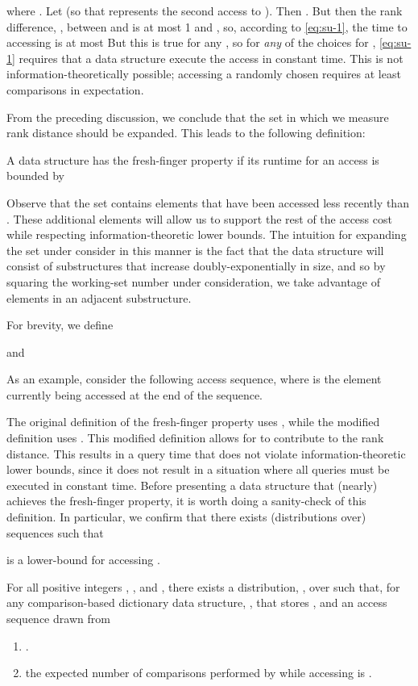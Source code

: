 \documentclass{llncs}
\begin{document}
where .  Let  (so that  represents the second access to ).  Then .  But then the rank difference, , between  and  is at most 1 and , so, according to \eqref{eq:su-1}, the time to accessing  is at most
But this is true for any , so for \emph{any} of the  choices for , \eqref{eq:su-1} requires that a data structure execute the access in constant time. This is not information-theoretically possible; accessing a randomly chosen  requires at least  comparisons in expectation.  

From the preceding discussion, we conclude that the set in which we measure rank distance should be expanded.  This leads to the following definition:

\begin{definition} A data structure has the fresh-finger property if its runtime for an access is bounded by

\end{definition}

Observe that the set  contains elements that have been accessed less recently than . These additional elements will allow us to support the rest of the access cost while respecting information-theoretic lower bounds. The intuition for expanding the set under consider in this manner is the fact that the data structure will consist of substructures that increase doubly-exponentially in size, and so by squaring the working-set number under consideration, we take advantage of elements in an adjacent substructure.

For brevity, we define

and


As an example, consider the following access sequence, where  is the element currently being accessed at the end of the sequence.


The original definition of the fresh-finger property uses , while the modified definition uses . This modified definition allows for  to contribute to the rank distance. This results in a query time that does not violate information-theoretic lower bounds, since it does not result in a situation where all  queries must be executed in constant time. 
Before presenting a data structure that (nearly) achieves the fresh-finger property, it is worth doing a sanity-check of this definition.  In particular, we confirm that there exists (distributions over) sequences  such that

is a lower-bound for accessing .

\begin{theorem}
  For all positive integers , , and , there exists a distribution, , over  such that, for any comparison-based dictionary data structure, , that stores , and an access sequence  drawn from 
\begin{enumerate}
 \item .
 \item the expected number of comparisons performed by  while accessing  is .
\end{enumerate}
\end{theorem}
\end{document}
